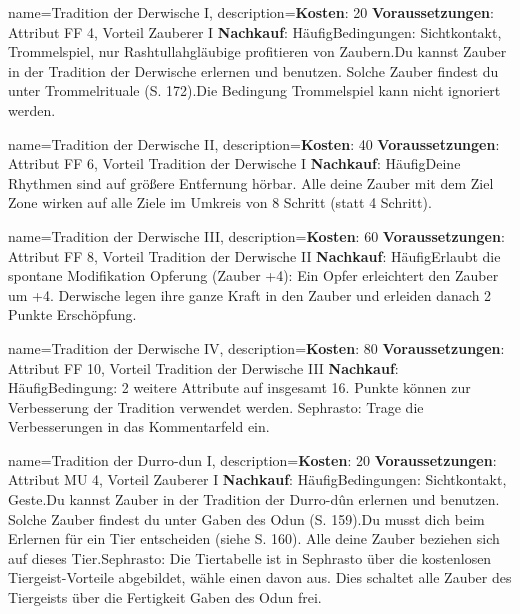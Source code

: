 {
    name={Tradition der Derwische I},
    description={\textbf{Kosten}: 20 \textbf{Voraussetzungen}: Attribut FF 4, Vorteil Zauberer I \textbf{Nachkauf}: Häufig\newline Bedingungen: Sichtkontakt, Trommelspiel, nur Rashtullahgläubige profitieren von Zaubern.\newline Du kannst Zauber in der Tradition der Derwische erlernen und benutzen. Solche Zauber findest du unter Trommelrituale (S. 172).\newline Die Bedingung Trommelspiel kann nicht ignoriert werden.}
}


{
    name={Tradition der Derwische II},
    description={\textbf{Kosten}: 40 \textbf{Voraussetzungen}: Attribut FF 6, Vorteil Tradition der Derwische I \textbf{Nachkauf}: Häufig\newline Deine Rhythmen sind auf größere Entfernung hörbar. Alle deine Zauber mit dem Ziel Zone wirken auf alle Ziele im Umkreis von 8 Schritt (statt 4 Schritt).}
}


{
    name={Tradition der Derwische III},
    description={\textbf{Kosten}: 60 \textbf{Voraussetzungen}: Attribut FF 8, Vorteil Tradition der Derwische II \textbf{Nachkauf}: Häufig\newline Erlaubt die spontane Modifikation Opferung (Zauber +4): Ein Opfer erleichtert den Zauber um +4. Derwische legen ihre ganze Kraft in den Zauber und erleiden danach 2 Punkte Erschöpfung.}
}


{
    name={Tradition der Derwische IV},
    description={\textbf{Kosten}: 80 \textbf{Voraussetzungen}: Attribut FF 10, Vorteil Tradition der Derwische III \textbf{Nachkauf}: Häufig\newline Bedingung: 2 weitere Attribute auf insgesamt 16. Punkte können zur Verbesserung der Tradition verwendet werden. Sephrasto: Trage die Verbesserungen in das Kommentarfeld ein.}
}


{
    name={Tradition der Durro-dun I},
    description={\textbf{Kosten}: 20 \textbf{Voraussetzungen}: Attribut MU 4, Vorteil Zauberer I \textbf{Nachkauf}: Häufig\newline Bedingungen: Sichtkontakt, Geste.\newline Du kannst Zauber in der Tradition der Durro-dûn erlernen und benutzen. Solche Zauber findest du unter Gaben des Odun (S. 159).\newline Du musst dich beim Erlernen für ein Tier entscheiden (siehe S. 160). Alle deine Zauber beziehen sich auf dieses Tier.\newline Sephrasto: Die Tiertabelle ist in Sephrasto über die kostenlosen Tiergeist-Vorteile abgebildet, wähle einen davon aus. Dies schaltet alle Zauber des Tiergeists über die Fertigkeit Gaben des Odun frei.}
}


